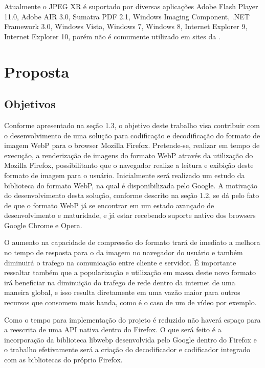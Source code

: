 \documentclass[espaco=simples,appendix=Name]{abnt}
\begin{document}
Atualmente o JPEG XR é suportado por diversas aplicações Adobe Flash Player 11.0, Adobe AIR 3.0, Sumatra PDF 2.1, Windows Imaging Component, .NET Framework 3.0, Windows Vista, Windows 7, Windows 8, Internet Explorer 9, Internet Explorer 10, porém não é comumente utilizado em sites da .\cite{HDPhoto}

\chapter{Proposta}

\section{Objetivos}

Conforme apresentado na seção 1.3, o objetivo deste trabalho visa contribuir com o desenvolvimento de uma solução para codificação e decodificação do formato de imagem WebP para o browser Mozilla Firefox. 
Pretende-se, realizar em tempo de execução, a renderização de imagens do formato WebP através da utilização do Mozilla Firefox, possibilitanto que o navegador realize a leitura e exibição deste formato de imagem para o usuário. Inicialmente será realizado um estudo da biblioteca do formato WebP, na qual é disponibilizada pelo Google. 
A motivação do desenvolvimento desta solução, conforme descrito na seção 1.2, se dá pelo fato de que o formato WebP já se encontrar em um estado avançado de desenvolvimento e maturidade, e já estar recebendo suporte nativo dos browsers Google Chrome e Opera. 

O aumento na capacidade de compressão do formato  trará de imediato a melhora no tempo de resposta para o  da imagem no navegador do usuário e também diminuirá o trafego na comunicação entre cliente e servidor. É importante ressaltar também que a popularização e utilização em massa deste novo formato irá beneficiar na diminuição do trafego de rede dentro da internet de uma maneira global, e isso resulta diretamente em uma vazão maior para outros recursos que consomem mais banda, como é o caso de um  de vídeo por exemplo.

Como o tempo para implementação do projeto é reduzido não haverá espaço para a reescrita de uma API nativa dentro do Firefox. O que será feito é a incorporação da biblioteca libwebp desenvolvida pelo Google dentro do Firefox e o trabalho efetivamente será a criação do decodificador e codificador integrado com as bibliotecas do próprio Firefox.
\end{document}
